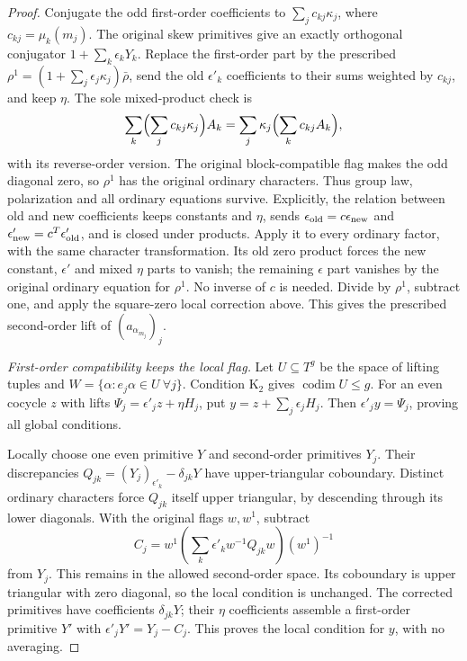 \begin{proof}
Conjugate the odd first-order coefficients to
\(\sum_jc_{kj}\kappa_j\), where \(c_{kj}=\mu_k(m_j)\).
The original skew primitives give an exactly orthogonal conjugator
\(1+\sum_k\epsilon_kY_k\).  Replace the first-order part by the
prescribed \(\rho^1=(1+\sum_j\epsilon_j\kappa_j)\bar\rho\),
send the old \(\epsilon'_k\) coefficients to their sums weighted
by \(c_{kj}\), and keep \(\eta\).  The sole mixed-product check is
\[
 \sum_k\Bigl(\sum_jc_{kj}\kappa_j\Bigr)A_k
       =\sum_j\kappa_j\Bigl(\sum_kc_{kj}A_k\Bigr),
\]
with its reverse-order version.  The original block-compatible
flag makes the odd diagonal zero, so \(\rho^1\) has the original
ordinary characters.  Thus group law, polarization and all
ordinary equations survive.  Explicitly, the relation between old
and new coefficients keeps constants and \(\eta\), sends
\(\epsilon_{\rm old}=c\epsilon_{\rm new}\) and
\(\epsilon'_{\rm new}=c^T\epsilon'_{\rm old}\), and is closed
under products.  Apply it to every ordinary factor, with the same
character transformation.  Its old zero product forces the new
constant, \(\epsilon'\) and mixed \(\eta\) parts to vanish;
the remaining \(\epsilon\) part vanishes by the original
ordinary equation for \(\rho^1\).  No inverse of \(c\) is needed.
Divide by \(\rho^1\), subtract one, and apply the square-zero
local correction above.  This gives the prescribed second-order
lift of \((a_{\alpha_{m_j}})_j\).

\emph{First-order compatibility keeps the local flag.}
Let \(U\subseteq T^g\) be the space of lifting tuples and
\(W=\{\alpha:e_j\alpha\in U\ \forall j\}\).
Condition \(\mathrm K_2\) gives \(\operatorname{codim}U\leq g\).
For an even cocycle \(z\) with lifts
\(\Psi_j=\epsilon'_jz+\eta H_j\), put
\(y=z+\sum_j\epsilon_jH_j\).  Then
\(\epsilon'_jy=\Psi_j\), proving all global conditions.

Locally choose one even primitive \(Y\) and second-order primitives
\(Y_j\).  Their discrepancies
\(Q_{jk}=(Y_j)_{\epsilon'_k}-\delta_{jk}Y\) have upper-triangular
coboundary.  Distinct ordinary characters force \(Q_{jk}\) itself
upper triangular, by descending through its lower diagonals.
With the original flags \(w,w^1\), subtract
\[
 C_j=w^1\left(\sum_k\epsilon'_k w^{-1}Q_{jk}w\right)(w^1)^{-1}
\]
from \(Y_j\).  This remains in the allowed second-order space.
Its coboundary is upper triangular with zero diagonal, so the
local condition is unchanged.  The corrected primitives have
coefficients \(\delta_{jk}Y\); their \(\eta\) coefficients assemble
a first-order primitive \(Y'\) with
\(\epsilon'_jY'=Y_j-C_j\).  This proves the local condition for
\(y\), with no averaging.


\end{proof}
